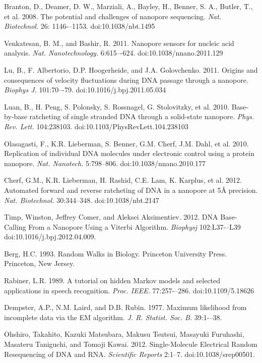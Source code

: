 \documentclass{biophys_letter}
\begin{document}
\begin{thebibliography}{99}

  Branton, D., Deamer, D. W., Marziali, A., Bayley, H., Benner, S. A., Butler, T., et al.
  2008.
  The potential and challenges of nanopore sequencing.
  {\it Nat. Biotechnol.}
  26: 1146-–1153.
  doi:10.1038/nbt.1495

  Venkatesan, B. M., and Bashir, R.
  2011.
  Nanopore sensors for nucleic acid analysis.
  {\it Nat. Nanotechnology.}
  6:615–-624.
  doi:10.1038/nnano.2011.129

  Lu, B., F. Albertorio, D.P. Hoogerheide, and J.A. Golovchenko.
  2011.
  Origins and consequences of velocity fluctuations during DNA passage through a nanopore.
  {\it Biophys J.}
  101:70–-79.
  doi:10.1016/j.bpj.2011.05.034

  Luan, B., H. Peng, S. Polonsky, S. Rossnagel, G. Stolovitzky, et al.
  2010.
  Base-by-base ratcheting of single stranded DNA through a solid-state nanopore.
  {\it Phys. Rev. Lett.}
  104:238103.
  doi:10.1103/PhysRevLett.104.238103

  Olasagasti, F., K.R. Lieberman, S. Benner, G.M. Cherf, J.M. Dahl, et al.
  2010.
  Replication of individual DNA molecules under electronic control using a protein nanopore.
  {\it Nat. Nanotech.}
  5:798–806.
  doi:10.1038/nnano.2010.177

  Cherf, G.M., K.R. Lieberman, H. Rashid, C.E. Lam, K. Karplus, et al.
  2012.
  Automated forward and reverse ratcheting of DNA in a nanopore at 5{\AA} precision.
  {\it Nat. Biotechnol.}
  30:344--348.
  doi:10.1038/nbt.2147

  Timp, Winston, Jeffrey Comer, and Aleksei Aksimentiev. 
  2012.
  DNA Base-Calling From a Nanopore Using a Viterbi Algorithm.
  {\it Biophysj}
  102:L37-–L39
  doi:10.1016/j.bpj.2012.04.009.

  Berg, H.C.
  1993.
  Random Walks in Biology.
  Princeton University Press.
  Princeton, New Jersey.

  Rabiner, L.R.
  1989.
  A tutorial on hidden Markov models and selected applications in speech recognition.
  {\it Proc. IEEE.}
  77:257-–286.
  doi:10.1109/5.18626

  Dempster, A.P., N.M. Laird, and D.B. Rubin.
  1977.
  Maximum likelihood from incomplete data via the EM algorithm.
  {\it J. R. Statist. Soc. B.}
  39:1-–38.

  Ohshiro, Takahito, Kazuki Matsubara, Makusu Tsutsui, Masayuki Furuhashi, Masateru Taniguchi, and Tomoji Kawai. 
  2012.
  Single-Molecule Electrical Random Resequencing of DNA and RNA.
  {\it Scientific Reports} 
  2:1--7.
  doi:10.1038/srep00501.
\end{thebibliography}

\end{document}
